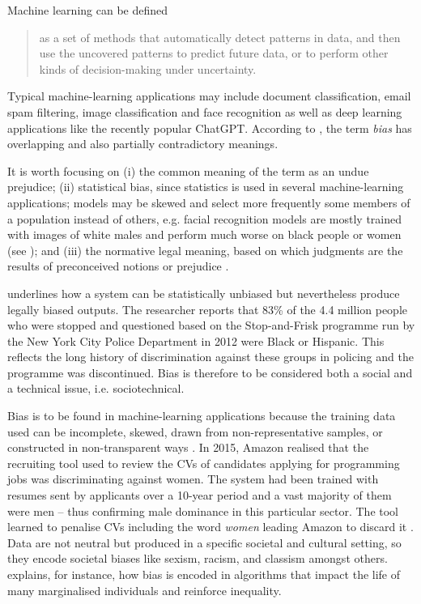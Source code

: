 Machine learning can be defined
\begin{quote}
    as a set of methods that automatically detect patterns in data, and then use the uncovered patterns to predict future data, or to perform other kinds of decision-making under uncertainty. \citep[1]{murphy2012machine}
\end{quote} Typical machine-learning applications may include document classification, email spam filtering, image classification and face recognition \citep[5]{murphy2012machine} as well as deep learning applications like the recently popular ChatGPT. According to \textcite{crawford2017keynote}, the term \textit{bias} has overlapping and also partially contradictory meanings. 

It is worth focusing on (i) the common meaning of the term as an undue prejudice; (ii) statistical bias, since statistics is used in several machine-learning applications; models may be skewed and select more frequently some members of a population instead of others, e.g. facial recognition models are mostly trained with images of white males and perform much worse on black people or women (see \cite{buolamwini2018gender}); and (iii) the normative legal meaning, based on which judgments are the results of preconceived notions or prejudice \citep{crawford2017keynote}. 

\textcite{crawford2017keynote} underlines how a system can be statistically unbiased but nevertheless produce legally biased outputs. The researcher reports that 83\% of the 4.4 million people who were stopped and questioned based on the Stop-and-Frisk programme run by the New York City Police Department in 2012 were Black or Hispanic. This reflects the long history of discrimination against these groups in policing and the programme was discontinued. Bias is therefore to be considered both a social and a technical issue, i.e. sociotechnical. 

Bias is to be found in machine-learning applications because the training data used can be incomplete, skewed, drawn from non-representative samples, or constructed in non-transparent ways \citep{crawford2017keynote}. In 2015, Amazon realised that the recruiting tool used to review the CVs of candidates applying for programming jobs was discriminating against women. The system had been trained with resumes sent by applicants over a 10-year period and a vast majority of them were men -- thus confirming male dominance in this particular sector. The tool learned to penalise CVs including the word \textit{women} leading Amazon to discard it \citep{dastin2018amazon}. Data are not neutral but produced in a specific societal and cultural setting, so they encode societal biases like sexism, racism, and classism amongst others. \textcite{o2017weapons} explains, for instance, how bias is encoded in algorithms that impact the life of many marginalised individuals and reinforce inequality.


